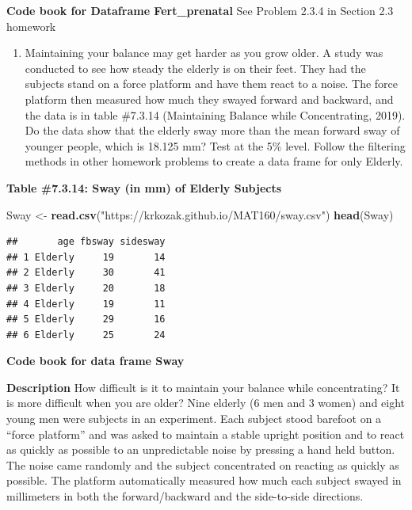 \documentclass[]{book}
\newenvironment{Shaded}{\begin{snugshade}}{\end{snugshade}}
\newcommand{\KeywordTok}[1]{\textcolor[rgb]{0.13,0.29,0.53}{\textbf{#1}}}
\newcommand{\NormalTok}[1]{#1}
\newcommand{\StringTok}[1]{\textcolor[rgb]{0.31,0.60,0.02}{#1}}
\providecommand{\tightlist}{%
  \setlength{\itemsep}{0pt}\setlength{\parskip}{0pt}}
\begin{document}
\textbf{Code book for Dataframe Fert\_prenatal} See Problem 2.3.4 in Section 2.3 homework

\begin{enumerate}
\def\labelenumi{\arabic{enumi}.}
\setcounter{enumi}{6}
\tightlist
\item
  Maintaining your balance may get harder as you grow older. A study was conducted to see how steady the elderly is on their feet. They had the subjects stand on a force platform and have them react to a noise. The force platform then measured how much they swayed forward and backward, and the data is in table \#7.3.14 (Maintaining Balance while Concentrating, 2019). Do the data show that the elderly sway more than the mean forward sway of younger people, which is 18.125 mm? Test at the 5\% level. Follow the filtering methods in other homework problems to create a data frame for only Elderly.
\end{enumerate}

\textbf{Table \#7.3.14: Sway (in mm) of Elderly Subjects}

\begin{Shaded}
\begin{Highlighting}[]
\NormalTok{Sway <-}\StringTok{ }\KeywordTok{read.csv}\NormalTok{(}\StringTok{"https://krkozak.github.io/MAT160/sway.csv"}\NormalTok{)}
\KeywordTok{head}\NormalTok{(Sway)}
\end{Highlighting}
\end{Shaded}

\begin{verbatim}
##       age fbsway sidesway
## 1 Elderly     19       14
## 2 Elderly     30       41
## 3 Elderly     20       18
## 4 Elderly     19       11
## 5 Elderly     29       16
## 6 Elderly     25       24
\end{verbatim}

\textbf{Code book for data frame Sway}

\textbf{Description}
How difficult is it to maintain your balance while concentrating? It is more difficult when you are older? Nine elderly (6 men and 3 women) and eight young men were subjects in an experiment. Each subject stood barefoot on a ``force platform'' and was asked to maintain a stable upright position and to react as quickly as possible to an unpredictable noise by pressing a hand held button. The noise came randomly and the subject concentrated on reacting as quickly as possible. The platform automatically measured how much each subject swayed in millimeters in both the forward/backward and the side-to-side directions.
\end{document}
